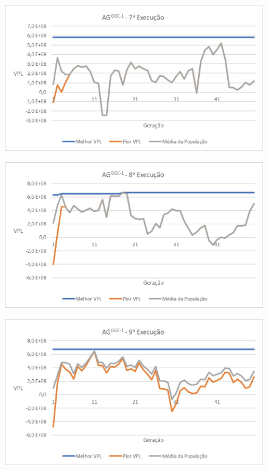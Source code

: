 \documentclass[12pt,a4paper]{report}
\begin{document}
\begin{figure}[H]
\centering

\includegraphics[scale=1]{GCC/7}
\end{figure}

\begin{figure}[H]
\centering

\includegraphics[scale=1]{GCC/8}
\end{figure}

\begin{figure}[H]
\centering

\includegraphics[scale=1]{GCC/9}
\end{figure}
\end{document}
